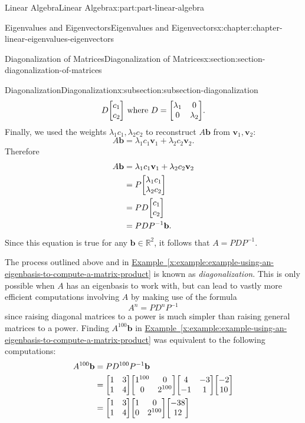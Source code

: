 \documentclass[twoside,10pt,]{book}
\newcommand{\xreffont}{\relax}
\numberwithin{equation}{part}
\newcommand{\RR}{\mathbb{R}}
\newcommand{\vv}{\mathbf{v}}
\newcommand{\bb}{\mathbf{b}}
\begin{document}
\begin{partptx}{Linear Algebra}{}{Linear Algebra}{}{}{x:part:part-linear-algebra}
\begin{chapterptx}{Eigenvalues and Eigenvectors}{}{Eigenvalues and Eigenvectors}{}{}{x:chapter:chapter-linear-eigenvalues-eigenvectors}
\begin{sectionptx}{Diagonalization of Matrices}{}{Diagonalization of Matrices}{}{}{x:section:section-diagonalization-of-matrices}
\begin{subsectionptx}{Diagonalization}{}{Diagonalization}{}{}{x:subsection:subsection-diagonalization}
\begin{equation*}
D\mqty[c_1 \\ c_2]\text{ where } D = \mqty[\lambda_1 & 0 \\ 0 & \lambda_2]\text{.}
\end{equation*}
Finally, we used the weights \(\lambda_1 c_1, \lambda_2 c_2\) to reconstruct \(A\bb\) from \(\vv_1,\vv_2\):%
\begin{equation*}
A\bb = \lambda_1 c_1\vv_1 + \lambda_2 c_2\vv_2\text{.}
\end{equation*}
Therefore%
\begin{align*}
A\bb & = \lambda_1 c_1\vv_1 + \lambda_2 c_2\vv_2\\
& = P\mqty[\lambda_1c_1 \\ \lambda_2c_2] \\
& = PD\mqty[c_1 \\ c_2] \\
& = PDP^{-1}\bb \text{.}
\end{align*}
Since this equation is true for any \(\bb\in\RR^2\), it follows that \(A = PDP^{-1}\).%
\par
The process outlined above and in \hyperref[x:example:example-using-an-eigenbasis-to-compute-a-matrix-product]{Example~{\xreffont\ref{x:example:example-using-an-eigenbasis-to-compute-a-matrix-product}}} is known as \emph{diagonalization}. This is only possible when \(A\) has an eigenbasis to work with, but can lead to vastly more efficient computations involving \(A\) by making use of the formula%
\begin{equation*}
A^n = PD^nP^{-1}
\end{equation*}
since raising diagonal matrices to a power is much simpler than raising general matrices to a power. Finding \(A^{100}\bb\) in \hyperref[x:example:example-using-an-eigenbasis-to-compute-a-matrix-product]{Example~{\xreffont\ref{x:example:example-using-an-eigenbasis-to-compute-a-matrix-product}}} was equivalent to the following computations:%
\begin{align*}
A^{100}\bb & = PD^{100}P^{-1}\bb \\
& = \mqty[1 & 3 \\ 1 & 4]\mqty[1^{100} & 0 \\ 0 & 2^{100}]\mqty[4 & -3 \\ -1 & 1]\mqty[-2 \\ 10] \\
& = \mqty[1 & 3 \\ 1 & 4]\mqty[1 & 0 \\ 0 & 2^{100}]\mqty[-38 \\ 12] \\

\end{align*}
\end{subsectionptx}
\end{sectionptx}
\end{chapterptx}
\end{partptx}
\end{document}
